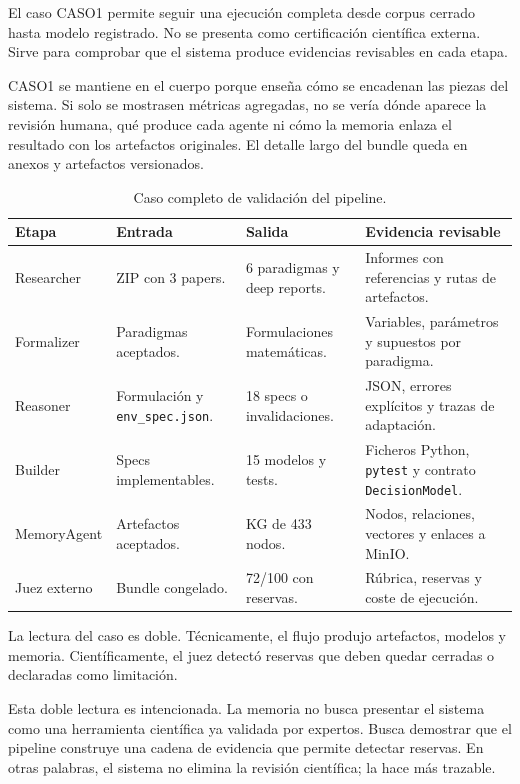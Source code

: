 El caso CASO1 permite seguir una ejecución completa desde corpus cerrado hasta
modelo registrado. No se presenta como certificación científica externa. Sirve
para comprobar que el sistema produce evidencias revisables en cada etapa.

CASO1 se mantiene en el cuerpo porque enseña cómo se encadenan las piezas del
sistema. Si solo se mostrasen métricas agregadas, no se vería dónde aparece la
revisión humana, qué produce cada agente ni cómo la memoria enlaza el resultado
con los artefactos originales. El detalle largo del bundle queda en anexos y
artefactos versionados.

\begin{table}[H]
\begin{center}
\scriptsize
\begin{tabular}{|p{2.4cm}|p{3.2cm}|p{3.1cm}|p{3.5cm}|} \hline
\textbf{Etapa} & \textbf{Entrada} & \textbf{Salida} & \textbf{Evidencia revisable} \\ \hline
Researcher & ZIP con 3 papers. & 6 paradigmas y deep reports. & Informes con referencias y rutas de artefactos. \\ \hline
Formalizer & Paradigmas aceptados. & Formulaciones matemáticas. & Variables, parámetros y supuestos por paradigma. \\ \hline
Reasoner & Formulación y \texttt{env\_spec.json}. & 18 specs o invalidaciones. & JSON, errores explícitos y trazas de adaptación. \\ \hline
Builder & Specs implementables. & 15 modelos y tests. & Ficheros Python, \texttt{pytest} y contrato \texttt{DecisionModel}. \\ \hline
MemoryAgent & Artefactos aceptados. & KG de 433 nodos. & Nodos, relaciones, vectores y enlaces a MinIO. \\ \hline
Juez externo & Bundle congelado. & 72/100 con reservas. & Rúbrica, reservas y coste de ejecución. \\ \hline
\end{tabular}
\caption{Caso completo de validación del pipeline.}
\end{center}
\end{table}

La lectura del caso es doble. Técnicamente, el flujo produjo artefactos,
modelos y memoria. Científicamente, el juez detectó reservas que deben quedar
cerradas o declaradas como limitación.

Esta doble lectura es intencionada. La memoria no busca presentar el sistema
como una herramienta científica ya validada por expertos. Busca demostrar que el
pipeline construye una cadena de evidencia que permite detectar reservas. En
otras palabras, el sistema no elimina la revisión científica; la hace más
trazable.

